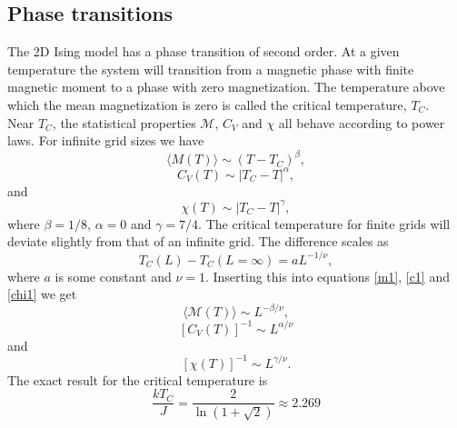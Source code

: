 \documentclass[notitlepage, reprint, nofootinbib]{revtex4-1}
\begin{document}
\subsection{Phase transitions}
The 2D Ising model has a phase transition of second order. At a given temperature the system will transition from a magnetic phase with finite magnetic moment to a phase with zero magnetization. The temperature above which the mean magnetization is zero is called the critical temperature, $T_C$. \\[2mm]
Near $T_C$, the statistical properties $\mathcal{M}$, $C_V$ and $\chi$ all behave according to power laws. For infinite grid sizes we have\cite{lecture_notes}
\begin{equation}\label{m1}\langle M(T)\rangle \sim (T-T_C)^\beta,\end{equation}
\begin{equation}\label{c1}C_V(T)\sim |T_C-T|^\alpha,\end{equation}
and
\begin{equation}\label{chi1}\chi(T)\sim |T_C-T|^\gamma,\end{equation}
where $\beta=1/8$, $\alpha=0$ and $\gamma=7/4$. The critical temperature for finite grids will deviate slightly from that of an infinite grid. The difference scales as 
\begin{equation}\label{T_C}T_C(L)-T_C(L=\infty)=aL^{-1/\nu},\end{equation}
where $a$ is some constant and $\nu=1$. Inserting this into equations \ref{m1}, \ref{c1} and \ref{chi1} we get 
\begin{equation}\label{m2}\langle \mathcal{M}(T)\rangle \sim L^{-\beta/\nu},\end{equation}
\begin{equation}\label{c2}[C_V(T)]^{-1}\sim L^{\alpha/\nu}\end{equation}
and
\begin{equation}\label{chi2}[\chi(T)]^{-1}\sim L^{\gamma/\nu}.\end{equation}
The exact result for the critical temperature is\cite{Onsager} 
\begin{equation}\label{onsager_tc}\frac{kT_C}{J}=\frac{2}{\ln (1+\sqrt{2})}\approx2.269\end{equation}
\end{document}
